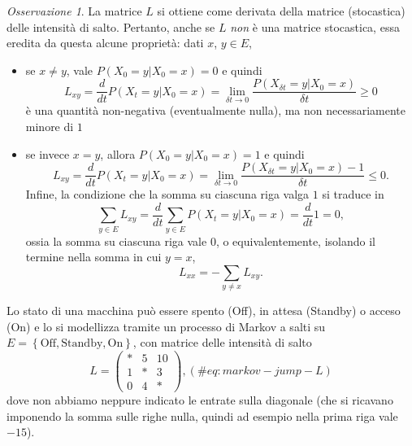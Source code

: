 \documentclass[
  italian,
  letterpaper,
]{book}
\providecommand{\tightlist}{%
  \setlength{\itemsep}{0pt}\setlength{\parskip}{0pt}}
\newcommand{\bra}[1]{\left( #1 \right)}
\newcommand{\cur}[1]{\left\{ #1 \right\}}
\theoremstyle{definition}
\theoremstyle{remark}
\newtheorem*{remark}{Osservazione}
\begin{document}
\begin{remark}
La matrice \(L\) si ottiene come derivata della matrice (stocastica)
delle intensità di salto. Pertanto, anche se \(L\) \emph{non} è una
matrice stocastica, essa eredita da questa alcune proprietà: dati \(x\),
\(y \in E\),

\begin{itemize}
\tightlist
\item
  se \(x\neq y\), vale \(P(X_{0} = y | X_0 =x) = 0\) e quindi
  \[ L_{xy} =\frac{d}{dt} P(X_{t} =y| X_0 =x) =  \lim_{\delta t \to 0}\frac{ P(X_{\delta t} = y | X_0 =x)}{\delta t} \ge 0\]
  è una quantità non-negativa (eventualmente nulla), ma non
  necessariamente minore di \(1\)
\item
  se invece \(x=y\), allora \(P(X_0 = y| X_0 = x) = 1\) e quindi
  \[ L_{xy} =\frac{d}{dt} P(X_{t} =y| X_0 =x) =  \lim_{\delta t \to 0}\frac{ P(X_{\delta t} = y | X_0 =x) -1}{\delta t} \le 0.\]
  Infine, la condizione che la somma su ciascuna riga valga \(1\) si
  traduce in
  \[ \sum_{y \in E} L_{xy} = \frac{d}{dt} \sum_{y \in E}  P(X_{t} =y| X_0 =x) = \frac{d}{dt} 1 = 0,\]
  ossia la somma su ciascuna riga vale \(0\), o equivalentemente,
  isolando il termine nella somma in cui \(y=x\),
  \[ L_{xx} = - \sum_{y \neq x} L_{xy}.\]
\end{itemize}

\end{remark}

Lo stato di una macchina può essere spento (Off), in attesa (Standby) o
acceso (On) e lo si modellizza tramite un processo di Markov a salti su
\(E = \cur{\text{Off},  \text{Standby}, \text{On}}\), con matrice delle
intensità di salto \[L  = \bra{ \begin{array}{ccc} * & 5 & 10 \\
 1 & * & 3 \\
 0 & 4 & *
 \end{array}},(\#eq:markov-jump-L)\] dove non abbiamo neppure indicato
le entrate sulla diagonale (che si ricavano imponendo la somma sulle
righe nulla, quindi ad esempio nella prima riga vale \(-15\)).
\end{document}
